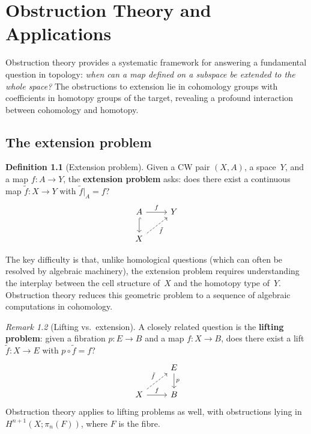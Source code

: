 \documentclass[12pt,a4paper,openany]{book}
\theoremstyle{definition}
\newtheorem{definition}{Definition}[chapter]
\theoremstyle{plain}
\theoremstyle{remark}
\newtheorem{remark}[definition]{Remark}
\begin{document}
\chapter{Obstruction Theory and Applications}\label{ch:obstruction-theory}
\minitoc\bigskip

Obstruction theory provides a systematic framework for answering a
fundamental question in topology: \emph{when can a map defined on a
subspace be extended to the whole space?}  The obstructions to
extension lie in cohomology groups with coefficients in homotopy
groups of the target, revealing a profound interaction between
cohomology and homotopy.

\section{The extension problem}\label{sec:extension-problem}

\begin{definition}[Extension problem]
Given a CW pair $(X,A)$, a space~$Y$, and a map $f\colon A\to Y$, the
\textbf{extension problem} asks: does there exist a continuous map
$\tilde f\colon X\to Y$ with $\tilde f|_A=f$?
\[
\begin{tikzcd}
  A \ar[r,"f"] \ar[d,hookrightarrow] & Y \\
  X \ar[ru,dashed,"\tilde f"']
\end{tikzcd}
\]
\end{definition}

The key difficulty is that, unlike homological questions (which can
often be resolved by algebraic machinery), the extension problem
requires understanding the interplay between the cell structure of~$X$
and the homotopy type of~$Y$.  Obstruction theory reduces this
geometric problem to a sequence of algebraic computations in
cohomology.

\begin{remark}[Lifting vs.\ extension]
A closely related question is the \textbf{lifting problem}: given a
fibration $p\colon E\to B$ and a map $f\colon X\to B$, does there
exist a lift $\tilde f\colon X\to E$ with $p\circ\tilde f=f$?
\[
\begin{tikzcd}
  & E \ar[d,"p"] \\
  X \ar[r,"f"] \ar[ru,dashed,"\tilde f"]
  & B
\end{tikzcd}
\]
Obstruction theory applies to lifting problems as well, with
obstructions lying in $H^{n+1}(X;\pi_n(F))$, where $F$ is the fibre.
\end{remark}
\end{document}
